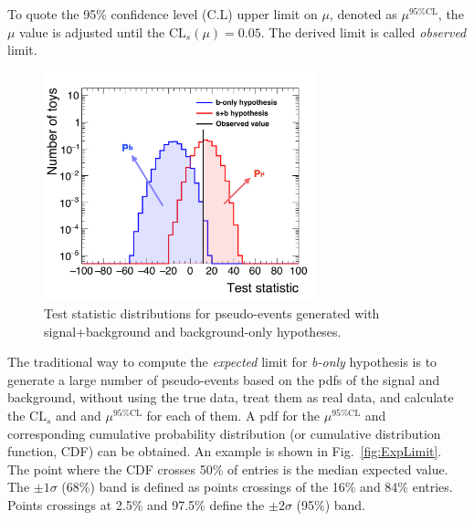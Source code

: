 	To quote the 95\% confidence level (C.L) upper limit on $\mu$, denoted as $\mu^{\text{95\%CL}}$, the $\mu$ value is adjusted until the $\text{CL}_{s}(\mu) = 0.05$. The derived limit is called \emph{observed} limit.\footnotemark
	
	\begin{figure}[!ht]\begin{center}
	  \includegraphics[width=0.7\textwidth]{Fig/TestStatistic_Illustration}
	  \caption{Test statistic distributions for pseudo-events generated with signal+background and background-only hypotheses. }
	\label{fig:TestStat}\end{center}\end{figure}
	
	The traditional way to compute the \emph{expected} limit for \emph{b-only} hypothesis is to generate a large number of pseudo-events based on the pdfs of the signal and background, without using the true data, treat them as real data, and calculate the $\text{CL}_{s}$ and and $\mu^{\text{95\%CL}}$ for each of them. A pdf for the $\mu^{\text{95\%CL}}$ and corresponding cumulative probability distribution (or cumulative distribution function, CDF) can be obtained. An example is shown in Fig.~\ref{fig:ExpLimit}. The point where the CDF crosses 50\% of entries is the median expected value. The $\pm1\sigma$ (68\%) band is defined as points crossings of the 16\% and 84\% entries. Points crossings at 2.5\% and 97.5\% define the $\pm2\sigma$ (95\%) band.
	
